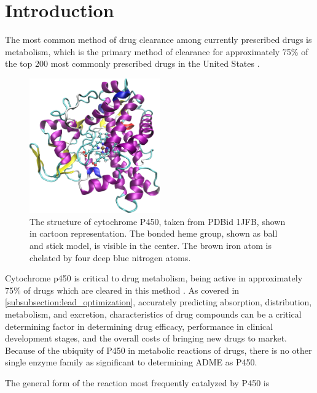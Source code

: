 \section{Introduction}
\label{section:p450/introduction}
The most common method of drug clearance among currently prescribed drugs is metabolism, which is the primary method of clearance for approximately 75\% of the top 200 most commonly prescribed drugs in the United States \cite{williams2004drug}.
\begin{figure}[h]
\centering
\includegraphics[width=0.5\textwidth]{figures/p450.png}
\caption{
The structure of cytochrome P450, taken from PDBid 1JFB, shown in cartoon representation.
The bonded heme group, shown as ball and stick model, is visible in the center.
The brown iron atom is chelated by four deep blue nitrogen atoms. 
}
\label{fig:p450}
\end{figure}
Cytochrome p450 is critical to drug metabolism, being active in approximately 75\% of drugs which are cleared in this method \cite{guengerich2007cytochrome}. 
As covered in \ref{subsubsection:lead_optimization}, accurately predicting  absorption, distribution, metabolism, and excretion, characteristics of drug compounds can be a critical determining factor in determining drug efficacy, performance in clinical development stages, and the overall costs of bringing new drugs to market.
Because of the ubiquity of P450 in metabolic reactions of drugs, there is no other single enzyme family as significant to determining ADME as P450.   

The general form of the reaction most frequently catalyzed by P450 is 


